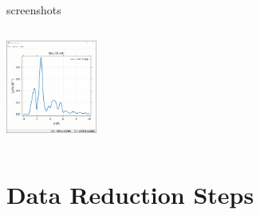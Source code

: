 \begin{slide}{ {\xasviewer} screenshots}
\begin{cenpage}{145mm}
\begin{columns}
\begin{column}{30mm}
        \vmm
        \includegraphics[width=30mm]{figs/Screenshots/XASViewer_EXAFS_plot_chir}

        \vmm \vfill
    \end{column}
\end{columns}
  





 \end{cenpage}
\end{slide}


\section{Data Reduction Steps}

